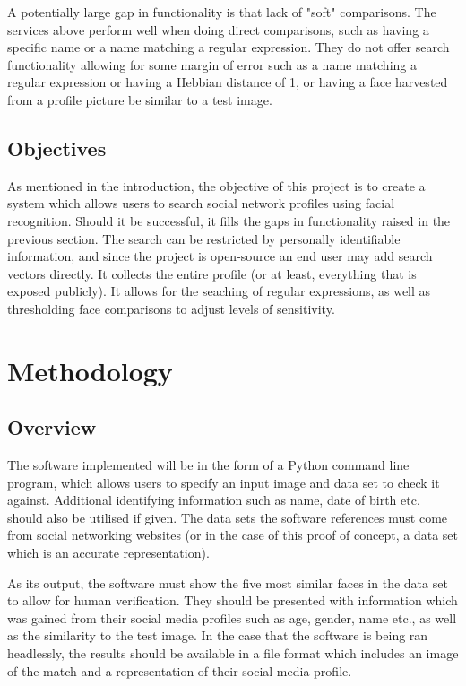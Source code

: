 \documentclass[12pt]{article}
\begin{document}
A potentially large gap in functionality is that lack of "soft" comparisons. The services above perform well when doing direct comparisons, such as having a specific name or a name matching a regular expression. They do not offer search functionality allowing for some margin of error such as a name matching a regular expression or having a Hebbian distance of 1, or having a face harvested from a profile picture be similar to a test image.

\subsection{Objectives}
As mentioned in the introduction, the objective of this project is to create a system which allows users to search social network profiles using facial recognition. Should it be successful, it fills the gaps in functionality raised in the previous section. The search can be restricted by personally identifiable information, and since the project is open-source an end user may add search vectors directly. It collects the entire profile (or at least, everything that is exposed publicly). It allows for the seaching of regular expressions, as well as thresholding face comparisons to adjust levels of sensitivity.

\newpage
\section{Methodology}
\subsection{Overview}
The software implemented will be in the form of a Python command line program, which allows users to specify an input image and data set to check it against. Additional identifying information such as name, date of birth etc. should also be utilised if given. The data sets the software references must come from social networking websites (or in the case of this proof of concept, a data set which is an accurate representation).

As its output, the software must show the five most similar faces in the data set to allow for human verification. They should be presented with information which was gained from their social media profiles such as age, gender, name etc., as well as the similarity to the test image. In the case that the software is being ran headlessly, the results should be available in a file format which includes an image of the match and a representation of their social media profile.
\end{document}

